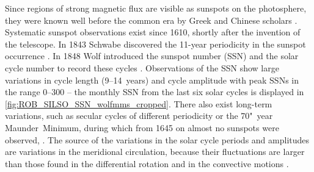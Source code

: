 Since regions of strong magnetic flux are visible as sunspots on the photosphere, they were known well before the common era by Greek and Chinese scholars \citep{Clark1978,Vaquero2007}. %
Systematic sunspot observations exist since 1610, shortly after the invention of the telescope. In 1843 Schwabe discovered the 11-year periodicity in the sunspot occurrence \citep[p.~124]{Schroeder2004}. In 1848 Wolf introduced the sunspot number (SSN) and the solar cycle number to record these cycles \citep{Hathaway2015}.	%
Observations of the SSN show large variations in cycle length (9--14~years) and cycle amplitude with peak SSNs in the range 0--300 \citep{Hathaway2015} -- the monthly SSN from the last six solar cycles is displayed in \autoref{fig:ROB_SILSO_SSN_wolfmms_cropped}. There also exist long-term variations, such as secular cycles of different periodicity or the 70"~year Maunder~Minimum, during which from 1645 on almost no sunspots were observed, \citep{Maunder1890}.	%
The source of the variations in the solar cycle periods and amplitudes are variations in the meridional circulation, because their fluctuations are larger than those found in the differential rotation and in the convective motions \citep{Hathaway2015}.
\begin{figure}[htb]
\end{figure}

